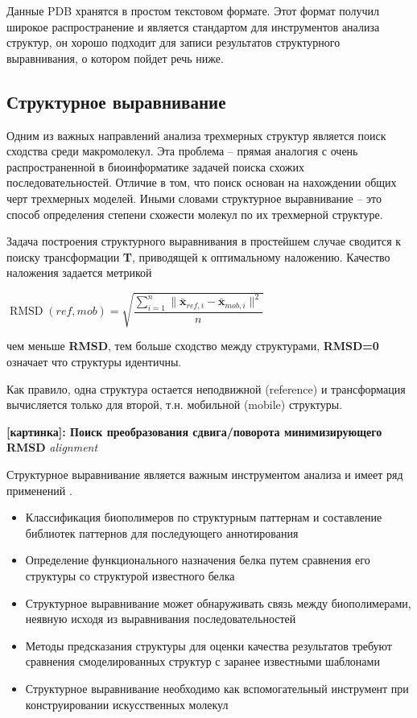 \documentclass[a4paper, 12pt, titlepage, utf8]{extarticle}
\newcommand{\myimage}[2]{   
    \begin{center} \textbf{[картинка]: #1} \textit{#2} \end{center} 
}
\begin{document}
Данные PDB хранятся в простом текстовом формате. Этот формат получил широкое распространение и является стандартом для инструментов анализа структур, он хорошо подходит для записи результатов структурного выравнивания, о котором пойдет речь ниже.

\subsection{Структурное выравнивание}
Одним из важных направлений анализа трехмерных структур является поиск сходства среди макромолекул. Эта проблема -- прямая аналогия с очень распространенной в биоинформатике задачей поиска схожих последовательностей. Отличие в том, что поиск основан на нахождении общих черт трехмерных моделей. Иными словами структурное выравнивание -- это способ определения степени схожести молекул по их трехмерной структуре.

Задача построения структурного выравнивания в простейшем случае сводится к поиску трансформации \textbf{T}, приводящей к оптимальному наложению. Качество наложения задается метрикой 
\begin{center} $ \operatorname{RMSD}(ref, mob) = \sqrt{ \dfrac{\sum_{i=1}^n \| \mathbf{\bar{x}}_{ref,i} -  \mathbf{\bar{x}}_{mob,i} \| ^2} {n} } $ \end{center}
чем меньше \textbf{RMSD}, тем больше сходство между структурами,  \textbf{RMSD=0}  означает что структуры идентичны.

Как правило, одна структура остается неподвижной (reference) и трансформация вычисляется только для второй, т.н. мобильной (mobile) структуры.

\myimage{Поиск преобразования сдвига/поворота минимизирующего RMSD}{alignment}

Структурное выравнивание является важным инструментом анализа и имеет ряд применений \cite{structural-bionformatics}.
\begin{itemize}
    \item Классификация биополимеров по структурным паттернам и составление библиотек паттернов для последующего аннотирования
    \item Определение функционального назначения белка путем сравнения его структуры со структурой известного белка
    \item Структурное выравнивание может обнаруживать связь между биополимерами, неявную исходя из выравнивания последовательностей 
    \item Методы предсказания структуры для оценки качества результатов требуют сравнения смоделированных структур с заранее известными шаблонами
    \item Структурное выравнивание необходимо как вспомогательный инструмент при конструировании искусственных молекул
\end{itemize}
\end{document}
